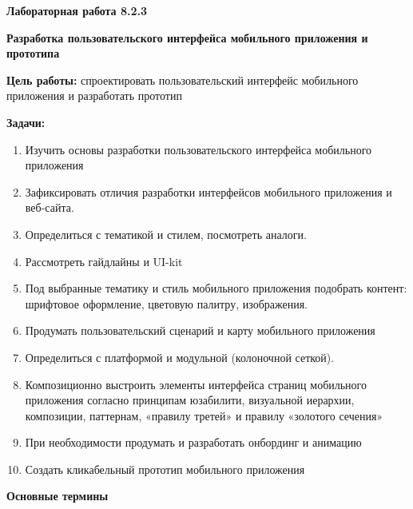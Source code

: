 
\graphicspath{ {8.2.3/models/} }
\usepackage{hyperref}

\pagestyle{fancy}
\fancyhead{}
\renewcommand{\headrulewidth}{0pt}


\begin{center}
    \textbf{Лабораторная работа 8.2.3}

    \textbf{Разработка пользовательского интерфейса мобильного приложения и прототипа}
\end{center}

\textbf{Цель работы:} спроектировать пользовательский интерфейс мобильного приложения и разработать прототип
\bigskip

\textbf{Задачи:}

\begin{enumerate}
    \item Изучить основы разработки пользовательского интерфейса мобильного приложения
    \item Зафиксировать отличия разработки интерфейсов мобильного приложения и веб-сайта.
    \item Определиться с тематикой и стилем, посмотреть аналоги.
    \item Рассмотреть гайдлайны и UI-kit
    \item Под выбранные тематику и стиль мобильного приложения подобрать контент: шрифтовое оформление, цветовую палитру, изображения.
    \item Продумать пользовательский сценарий и карту мобильного приложения
    \item Определиться с платформой и модульной (колоночной сеткой).
    \item Композиционно выстроить элементы интерфейса страниц мобильного приложения согласно принципам юзабилити, визуальной иерархии, композиции, паттернам, «правилу третей» и правилу «золотого сечения»
    \item При необходимости продумать и разработать онбординг и анимацию
    \item Создать кликабельный прототип мобильного приложения
\end{enumerate}
\bigskip

\textbf{Основные термины}

